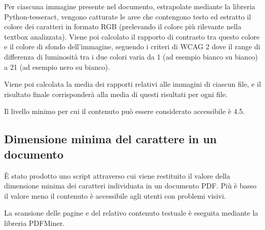 Per ciascuna immagine presente nel documento, estrapolate mediante la libreria Python-tesseract, vengono catturate le aree che contengono testo ed estratto il colore dei caratteri in formato RGB (prelevando il colore più rilevante nella textbox analizzata). Viene poi calcolato il rapporto di contrasto tra questo colore e il colore di sfondo dell'immagine, seguendo i criteri di WCAG 2 dove il range di differenza di luminosità tra i due colori varia da 1 (ad esempio bianco su bianco) a 21 (ad esempio nero su bianco). 

Viene poi calcolata la media dei rapporti relativi alle immagini di ciascun file, e il risultato finale corrisponderà alla media di questi risultati per ogni file.

Il livello minimo per cui il contenuto può essere considerato accessibile è 4.5.

\subsection{Dimensione minima del carattere in un documento}
È stato prodotto uno script attraverso cui viene restituito il valore della dimensione minima dei caratteri individuata in un documento PDF. Più è basso il valore meno il contenuto è accessibile agli utenti con problemi visivi.

La scansione delle pagine e del relativo contenuto testuale è eseguita mediante la libreria PDFMiner.